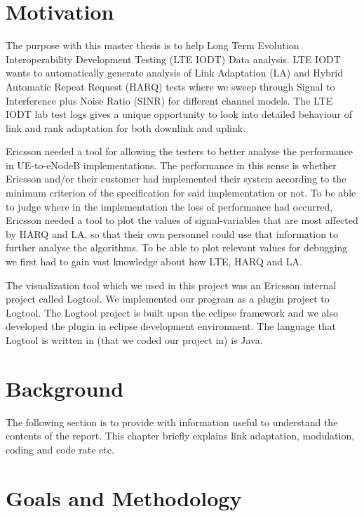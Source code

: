 \documentclass[cropmarks, frame, english]{idamasterthesis}
\begin{document}
\newpage
\section{Motivation}
The purpose with this master thesis is to help Long Term Evolution Interoperability Development Testing (LTE IODT) Data analysis. LTE IODT wants to automatically generate analysis of Link Adaptation (LA) and Hybrid Automatic Repeat Request (HARQ) tests where we sweep through Signal to Interference plus Noise Ratio (SINR) for different channel models. The LTE IODT lab test logs gives a unique opportunity to look into detailed behaviour of link and rank adaptation for both downlink and uplink. \newline

Ericsson needed a tool for allowing the testers to better analyse the performance in UE-to-eNodeB implementations. The performance in this sense is whether Ericsson and/or their customer had implemented their system according to the minimum criterion of the specification for said implementation or not. To be able to judge where in the implementation the loss of performance had occurred, Ericsson needed a tool to plot the values of signal-variables that are most affected by HARQ and LA, so that their own personnel could use that information to further analyse the algorithms. To be able to plot relevant values for debugging we first had to gain vast knowledge about how LTE, HARQ and LA. \newline

The visualization tool which we used in this project was an Ericsson internal project called Logtool. We implemented our program as a plugin project to Logtool. The Logtool project is built upon the eclipse framework and we also developed the plugin in eclipse development environment. The language that Logtool is written in (that we coded our project in) is Java.
 
\section{Background}
The following section is to provide with information useful to understand the contents of the report. This chapter briefly explains link adaptation, modulation, coding and code rate etc.

\section{Goals and Methodology}
\end{document}
